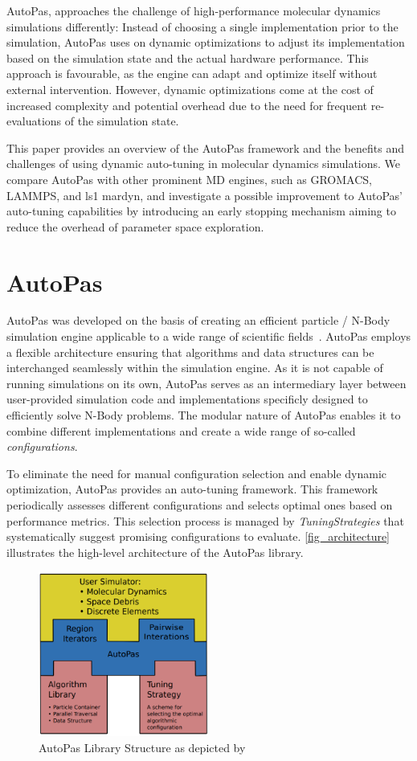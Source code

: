 \documentclass[conference]{IEEEtran}
\begin{document}
AutoPas, approaches the challenge of high-performance molecular dynamics simulations differently: Instead of choosing a single implementation prior to the simulation, AutoPas uses on dynamic optimizations to adjust its implementation based on the simulation state and the actual hardware performance. This approach is favourable, as the engine can adapt and optimize itself without external intervention. However, dynamic optimizations come at the cost of increased complexity and potential overhead due to the need for frequent re-evaluations of the simulation state.

This paper provides an overview of the AutoPas framework and the benefits and challenges of using dynamic auto-tuning in molecular dynamics simulations. We compare AutoPas with other prominent MD engines, such as GROMACS, LAMMPS, and ls1 mardyn, and investigate a possible improvement to AutoPas' auto-tuning capabilities by introducing an early stopping mechanism aiming to reduce the overhead of parameter space exploration.

\section{AutoPas}

AutoPas was developed on the basis of creating an efficient particle / N-Body simulation engine applicable to a wide range of scientific fields~\cite{Tchipev2020}. AutoPas employs a flexible architecture ensuring that algorithms and data structures can be interchanged seamlessly within the simulation engine. As it is not capable of running simulations on its own, AutoPas serves as an intermediary layer between user-provided simulation code and implementations specificly designed to efficiently solve N-Body problems. The modular nature of AutoPas enables it to combine different implementations and create a wide range of so-called \textit{configurations}.

To eliminate the need for manual configuration selection and enable dynamic optimization, AutoPas provides an auto-tuning framework. This framework periodically assesses different configurations and selects optimal ones based on performance metrics. This selection process is managed by \textit{TuningStrategies} that systematically suggest promising configurations to evaluate. \autoref{fig_architecture} illustrates the high-level architecture of the AutoPas library.

\begin{figure}[H]
    \centering
    \includegraphics[width=2.2in]{figures/AutoPasLibraryStructure.png}
    \caption{AutoPas Library Structure as depicted by~\cite{Newcome2023Poster}}
    \label{fig_architecture}
\end{figure}
\end{document}
